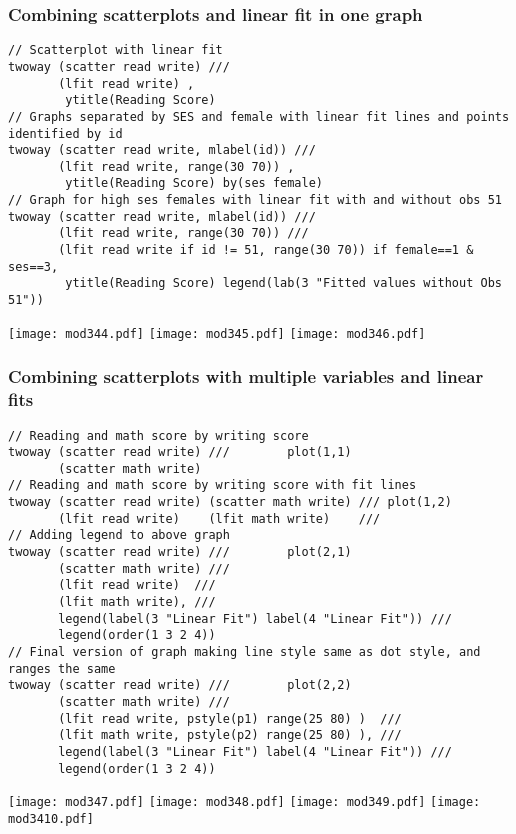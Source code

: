\subsubsection{Combining scatterplots and linear fit in one graph}

\begin{lstlisting}
// Scatterplot with linear fit
twoway (scatter read write) ///
       (lfit read write) ,
        ytitle(Reading Score)
// Graphs separated by SES and female with linear fit lines and points identified by id
twoway (scatter read write, mlabel(id)) ///
       (lfit read write, range(30 70)) ,
        ytitle(Reading Score) by(ses female)
// Graph for high ses females with linear fit with and without obs 51
twoway (scatter read write, mlabel(id)) ///
       (lfit read write, range(30 70)) ///
       (lfit read write if id != 51, range(30 70)) if female==1 & ses==3,
        ytitle(Reading Score) legend(lab(3 "Fitted values without Obs 51"))
\end{lstlisting}
\begin{center}
\texttt{[image: mod344.pdf]}
\texttt{[image: mod345.pdf]}
\texttt{[image: mod346.pdf]}
\end{center}

\subsubsection{Combining scatterplots with multiple variables and linear fits}

\begin{lstlisting}
// Reading and math score by writing score
twoway (scatter read write) ///        plot(1,1)
       (scatter math write)
// Reading and math score by writing score with fit lines
twoway (scatter read write) (scatter math write) /// plot(1,2)
       (lfit read write)    (lfit math write)    ///
// Adding legend to above graph
twoway (scatter read write) ///        plot(2,1)
       (scatter math write) ///
       (lfit read write)  ///
       (lfit math write), ///
       legend(label(3 "Linear Fit") label(4 "Linear Fit")) ///
       legend(order(1 3 2 4))
// Final version of graph making line style same as dot style, and ranges the same
twoway (scatter read write) ///        plot(2,2)
       (scatter math write) ///
       (lfit read write, pstyle(p1) range(25 80) )  ///
       (lfit math write, pstyle(p2) range(25 80) ), ///
       legend(label(3 "Linear Fit") label(4 "Linear Fit")) ///
       legend(order(1 3 2 4))
\end{lstlisting}
\begin{center}
\texttt{[image: mod347.pdf]}
\texttt{[image: mod348.pdf]}
\texttt{[image: mod349.pdf]}
\texttt{[image: mod3410.pdf]}
\end{center}


